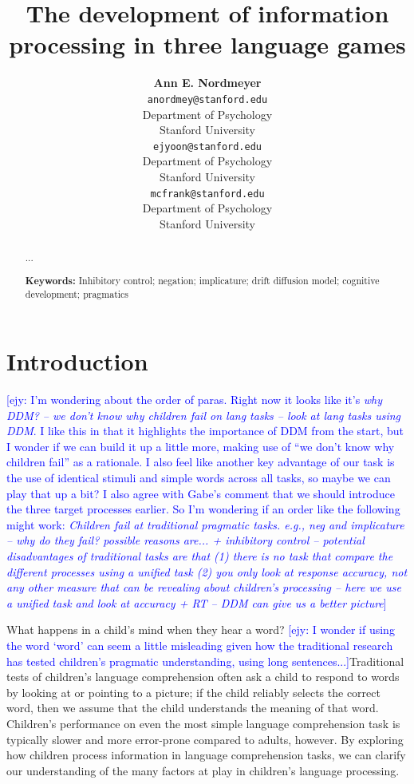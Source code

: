 \documentclass[10pt,letterpaper]{article}
\title{The development of information processing in three language games}
\author{{\large \bf Ann E. Nordmeyer} \\
  \texttt{anordmey@stanford.edu} \\
  Department of Psychology \\
  Stanford University
  \And {\large \bf Erica J. Yoon} \\
  \texttt{ejyoon@stanford.edu} \\
  Department of Psychology \\
  Stanford University
  \And {\large \bf Michael C. Frank} \\
  \texttt{mcfrank@stanford.edu} \\
  Department of Psychology \\
  Stanford University}
\newcommand{\ejy}[1]{\textcolor{Blue}{[ejy: #1]}}  %
\begin{document}
\maketitle


\begin{abstract}

...

\textbf{Keywords:} 
Inhibitory control; negation; implicature; drift diffusion model; cognitive development; pragmatics

\end{abstract}


\section{Introduction}

\ejy{I'm wondering about the order of paras. Right now it looks like it's \emph{why DDM? -- we don't know why children fail on lang tasks -- look at lang tasks using DDM}. I like this in that it highlights the importance of DDM from the start, but I wonder if we can build it up a little more, making use of ``we don't know why children fail'' as a rationale. I also feel like another key advantage of our task is the use of identical stimuli and simple words across all tasks, so maybe we can play that up a bit? I also agree with Gabe's comment that we should introduce the three target processes earlier. So I'm wondering if an order like the following might work: \emph{Children fail at traditional pragmatic tasks. e.g., neg and implicature -- why do they fail? possible reasons are... + inhibitory control -- potential disadvantages of traditional tasks are that (1) there is no task that compare the different processes using a unified task (2) you only look at response accuracy, not any other measure that can be revealing about children's processing -- here we use a unified task and look at accuracy + RT -- DDM can give us a better picture}}

What happens in a child's mind when they hear a word?  \ejy{I wonder if using the word `word' can seem a little misleading given how the traditional research has tested children's pragmatic understanding, using long sentences...}Traditional tests of children's language comprehension often ask a child to respond to words by looking at or pointing to a picture; if the child reliably selects the correct word, then we assume that the child understands the meaning of that word.  Children's performance on even the most simple language comprehension task is typically slower and more error-prone compared to adults, however.  By exploring how children process information in language comprehension tasks, we can clarify our understanding of the many factors at play in children's language processing.
\end{document}
